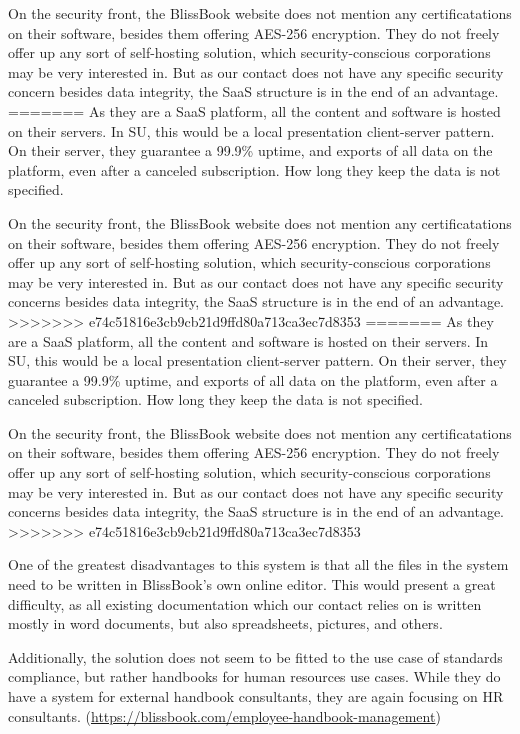 On the security front, the BlissBook website does not mention any certificatations on their software, besides them offering AES-256 encryption. %
They do not freely offer up any sort of self-hosting solution, which security-conscious corporations may be very interested in. But as our contact does not have any specific security concern besides data integrity, the SaaS structure is in the end of an advantage.
=======
As they are a SaaS platform, all the content and software is hosted on their servers. In SU, this would be a local presentation client-server pattern.
On their server, they guarantee a 99.9\% uptime, and exports of all data on the platform, even after a canceled subscription. How long they keep the data is not specified.

On the security front, the BlissBook website does not mention any certificatations on their software, besides them offering AES-256 encryption. %
They do not freely offer up any sort of self-hosting solution, which security-conscious corporations may be very interested in. But as our contact does not have any specific security concerns besides data integrity, the SaaS structure is in the end of an advantage.
>>>>>>> e74c51816e3cb9cb21d9ffd80a713ca3ec7d8353
=======
As they are a SaaS platform, all the content and software is hosted on their servers. In SU, this would be a local presentation client-server pattern.
On their server, they guarantee a 99.9\% uptime, and exports of all data on the platform, even after a canceled subscription. How long they keep the data is not specified.

On the security front, the BlissBook website does not mention any certificatations on their software, besides them offering AES-256 encryption. %
They do not freely offer up any sort of self-hosting solution, which security-conscious corporations may be very interested in. But as our contact does not have any specific security concerns besides data integrity, the SaaS structure is in the end of an advantage.
>>>>>>> e74c51816e3cb9cb21d9ffd80a713ca3ec7d8353

One of the greatest disadvantages to this system is that all the files in the system need to be written in BlissBook's own online editor. This would present a great difficulty, as all existing documentation which our contact relies on is written mostly in word documents, but also spreadsheets, pictures, and others.

Additionally, the solution does not seem to be fitted to the use case of standards compliance, but rather handbooks for human resources use cases. While they do have a system for external handbook consultants, they are again focusing on HR consultants. (\url{https://blissbook.com/employee-handbook-management})

